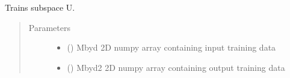 \documentclass[letterpaper,10pt,english]{sphinxmanual}
\begin{document}
\begin{fulllineitems}
\begin{fulllineitems}
\label{\detokenize{rom:rom.response_surfaces.NN_alt.train_sub}}
\sphinxAtStartPar
Trains subspace U.
\begin{quote}\begin{description}
\item[{Parameters}] \leavevmode\begin{itemize}
\item {} 
\sphinxAtStartPar
{} () \textendash{} M\sphinxhyphen{}by\sphinxhyphen{}d 2D numpy array containing input training data

\item {} 
\sphinxAtStartPar
{} () \textendash{} M\sphinxhyphen{}by\sphinxhyphen{}d2 2D numpy array containing output training data

\end{itemize}

\end{description}\end{quote}

\end{fulllineitems}


\end{fulllineitems}

\end{document}
